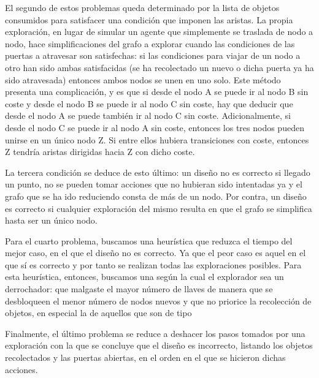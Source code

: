 El segundo de estos problemas queda determinado por la lista de objetos consumidos para satisfacer una condición que imponen las aristas. La propia exploración, en lugar de simular un agente que simplemente se traslada de nodo a nodo, hace simplificaciones del grafo a explorar cuando las condiciones de las puertas a atravesar son satisfechas: si las condiciones para viajar de un nodo a otro han sido ambas satisfacidas (se ha recolectado un nuevo  o dicha puerta ya ha sido atravesada) entonces ambos nodos se unen en uno solo.
Este método presenta una complicación, y es que si desde el nodo A se puede ir al nodo B sin coste y desde el nodo B se puede ir al nodo C sin coste, hay que deducir que desde el nodo A se puede también ir al nodo C sin coste. Adicionalmente, si desde el nodo C se puede ir al nodo A sin coste, entonces los tres nodos pueden unirse en un único nodo Z. Si entre ellos hubiera transiciones con coste, entonces Z tendría aristas dirigidas hacia Z con dicho coste.

La tercera condición se deduce de esto último: un diseño no es correcto si llegado un punto, no se pueden tomar acciones que no hubieran sido intentadas ya y el grafo que se ha ido reduciendo consta de más de un nodo. Por contra, un diseño es correcto si cualquier exploración del mismo resulta en que el grafo se simplifica hasta ser un único nodo.

Para el cuarto problema, buscamos una heurística que reduzca el tiempo del mejor caso, en el que el diseño no es correcto. Ya que el peor caso es aquel en el que sí es correcto y por tanto se realizan todas las exploraciones posibles.
Para esta heurística, entonces, buscamos una según la cual el explorador sea un derrochador: que malgaste el mayor número de llaves de manera que se desbloqueen el menor número de nodos nuevos y que no priorice la recolección de objetos, en especial la de aquellos que son de tipo 

Finalmente, el último problema se reduce a deshacer los pasos tomados por una exploración con la que se concluye que el diseño es incorrecto, listando los objetos recolectados y las puertas abiertas, en el orden en el que se hicieron dichas acciones.

